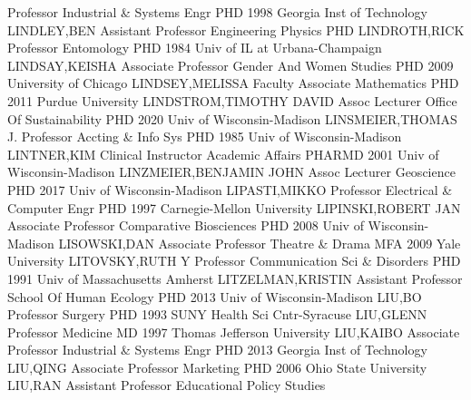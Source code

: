 \documentclass[
]{article}
\begin{document}
\textbar Professor \textbar Industrial \& Systems Engr \textbar PHD 1998
Georgia Inst of Technology \textbar LINDLEY,BEN \textbar{} 
\textbar Assistant Professor \textbar Engineering Physics \textbar PHD
\textbar LINDROTH,RICK \textbar{}  \textbar Professor
\textbar Entomology \textbar PHD 1984 Univ of IL at Urbana-Champaign
\textbar LINDSAY,KEISHA \textbar{}  \textbar Associate
Professor \textbar Gender And Women Studies \textbar PHD 2009 University
of Chicago \textbar LINDSEY,MELISSA \textbar{} 
\textbar Faculty Associate \textbar Mathematics \textbar PHD 2011 Purdue
University \textbar LINDSTROM,TIMOTHY DAVID \textbar{} 
\textbar Assoc Lecturer \textbar Office Of Sustainability \textbar PHD
2020 Univ of Wisconsin-Madison \textbar LINSMEIER,THOMAS J. \textbar{}
 \textbar Professor \textbar Accting \& Info Sys
\textbar PHD 1985 Univ of Wisconsin-Madison \textbar LINTNER,KIM
\textbar{}  \textbar Clinical Instructor \textbar Academic
Affairs \textbar PHARMD 2001 Univ of Wisconsin-Madison
\textbar LINZMEIER,BENJAMIN JOHN \textbar{}  \textbar Assoc
Lecturer \textbar Geoscience \textbar PHD 2017 Univ of Wisconsin-Madison
\textbar LIPASTI,MIKKO \textbar{}  \textbar Professor
\textbar Electrical \& Computer Engr \textbar PHD 1997 Carnegie-Mellon
University \textbar LIPINSKI,ROBERT JAN \textbar{} 
\textbar Associate Professor \textbar Comparative Biosciences
\textbar PHD 2008 Univ of Wisconsin-Madison \textbar LISOWSKI,DAN
\textbar{}  \textbar Associate Professor \textbar Theatre \&
Drama \textbar MFA 2009 Yale University \textbar LITOVSKY,RUTH Y
\textbar{}  \textbar Professor \textbar Communication Sci \&
Disorders \textbar PHD 1991 Univ of Massachusetts Amherst
\textbar LITZELMAN,KRISTIN \textbar{}  \textbar Assistant
Professor \textbar School Of Human Ecology \textbar PHD 2013 Univ of
Wisconsin-Madison \textbar LIU,BO \textbar{} 
\textbar Professor \textbar Surgery \textbar PHD 1993 SUNY Health Sci
Cntr-Syracuse \textbar LIU,GLENN \textbar{} 
\textbar Professor \textbar Medicine \textbar MD 1997 Thomas Jefferson
University \textbar LIU,KAIBO \textbar{}  \textbar Associate
Professor \textbar Industrial \& Systems Engr \textbar PHD 2013 Georgia
Inst of Technology \textbar LIU,QING \textbar{} 
\textbar Associate Professor \textbar Marketing \textbar PHD 2006 Ohio
State University \textbar LIU,RAN \textbar{} 
\textbar Assistant Professor \textbar Educational Policy Studies
\end{document}
